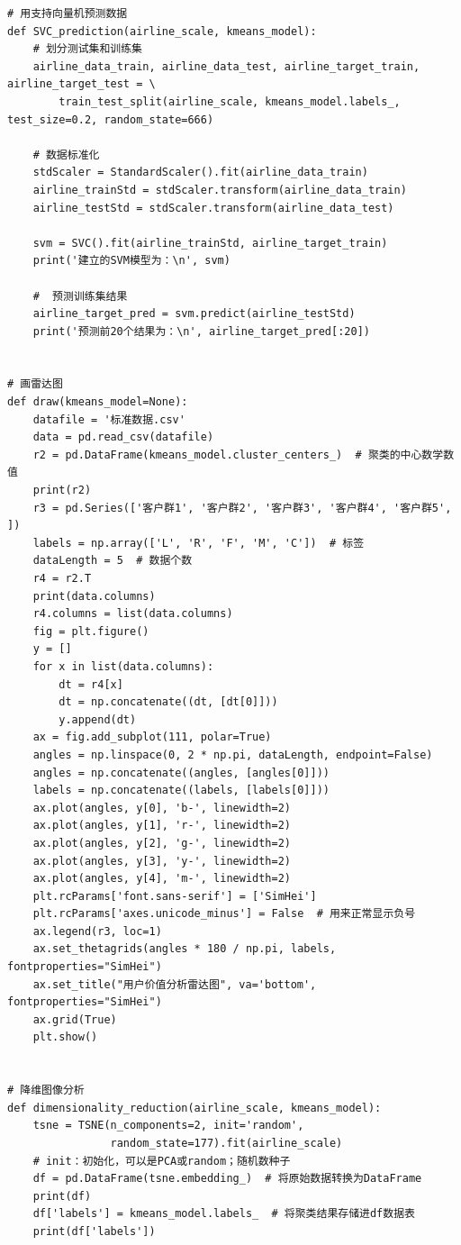 \documentclass[UTF8,12pt]{article}
\begin{document}
\begin{lstlisting}[title=DataAnalysis\.py,frame=shadowbox]
# 用支持向量机预测数据
def SVC_prediction(airline_scale, kmeans_model):
    # 划分测试集和训练集
    airline_data_train, airline_data_test, airline_target_train, airline_target_test = \
        train_test_split(airline_scale, kmeans_model.labels_, test_size=0.2, random_state=666)

    # 数据标准化
    stdScaler = StandardScaler().fit(airline_data_train)
    airline_trainStd = stdScaler.transform(airline_data_train)
    airline_testStd = stdScaler.transform(airline_data_test)

    svm = SVC().fit(airline_trainStd, airline_target_train)
    print('建立的SVM模型为：\n', svm)

    #  预测训练集结果
    airline_target_pred = svm.predict(airline_testStd)
    print('预测前20个结果为：\n', airline_target_pred[:20])


# 画雷达图
def draw(kmeans_model=None):
    datafile = '标准数据.csv'
    data = pd.read_csv(datafile)
    r2 = pd.DataFrame(kmeans_model.cluster_centers_)  # 聚类的中心数学数值
    print(r2)
    r3 = pd.Series(['客户群1', '客户群2', '客户群3', '客户群4', '客户群5', ])
    labels = np.array(['L', 'R', 'F', 'M', 'C'])  # 标签
    dataLength = 5  # 数据个数
    r4 = r2.T
    print(data.columns)
    r4.columns = list(data.columns)
    fig = plt.figure()
    y = []
    for x in list(data.columns):
        dt = r4[x]
        dt = np.concatenate((dt, [dt[0]]))
        y.append(dt)
    ax = fig.add_subplot(111, polar=True)
    angles = np.linspace(0, 2 * np.pi, dataLength, endpoint=False)
    angles = np.concatenate((angles, [angles[0]]))
    labels = np.concatenate((labels, [labels[0]]))
    ax.plot(angles, y[0], 'b-', linewidth=2)
    ax.plot(angles, y[1], 'r-', linewidth=2)
    ax.plot(angles, y[2], 'g-', linewidth=2)
    ax.plot(angles, y[3], 'y-', linewidth=2)
    ax.plot(angles, y[4], 'm-', linewidth=2)
    plt.rcParams['font.sans-serif'] = ['SimHei']
    plt.rcParams['axes.unicode_minus'] = False  # 用来正常显示负号
    ax.legend(r3, loc=1)
    ax.set_thetagrids(angles * 180 / np.pi, labels, fontproperties="SimHei")
    ax.set_title("用户价值分析雷达图", va='bottom', fontproperties="SimHei")
    ax.grid(True)
    plt.show()


# 降维图像分析
def dimensionality_reduction(airline_scale, kmeans_model):
    tsne = TSNE(n_components=2, init='random',
                random_state=177).fit(airline_scale)
    # init：初始化，可以是PCA或random；随机数种子
    df = pd.DataFrame(tsne.embedding_)  # 将原始数据转换为DataFrame
    print(df)
    df['labels'] = kmeans_model.labels_  # 将聚类结果存储进df数据表
    print(df['labels'])


\end{lstlisting}
\end{document}
